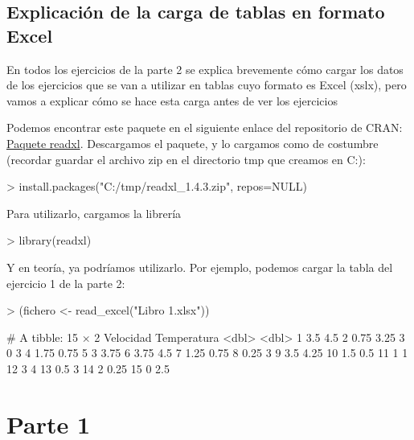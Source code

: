 \documentclass[parskip=full]{scrartcl}
\begin{document}
\subsection{Explicación de la carga de tablas en formato Excel}

En todos los ejercicios de la parte 2 se explica brevemente cómo cargar los datos de los ejercicios que se van a utilizar en tablas cuyo formato es Excel (xslx), pero vamos a explicar cómo se hace esta carga antes de ver los ejercicios

Podemos encontrar este paquete en el siguiente enlace del repositorio de CRAN: \href{https://cran.rediris.es/web/packages/readxl/index.html}{Paquete readxl}. Descargamos el paquete, y lo cargamos como de costumbre (recordar guardar el archivo zip en el directorio tmp que creamos en C:):


\begin{Schunk}
\begin{Sinput}
> install.packages("C:/tmp/readxl_1.4.3.zip", repos=NULL)
\end{Sinput}
\end{Schunk}


Para utilizarlo, cargamos la librería


\begin{Schunk}
\begin{Sinput}
> library(readxl)
\end{Sinput}
\end{Schunk}


Y en teoría, ya podríamos utilizarlo. Por ejemplo, podemos cargar la tabla del ejercicio 1 de la parte 2:


\begin{Schunk}
\begin{Sinput}
> (fichero <- read_excel("Libro 1.xlsx"))
\end{Sinput}
\begin{Soutput}
# A tibble: 15 × 2
   Velocidad Temperatura
       <dbl>       <dbl>
 1      3.5         4.5 
 2      0.75        3.25
 3      0           3   
 4      1.75        0.75
 5      3           3.75
 6      3.75        4.5 
 7      1.25        0.75
 8      0.25        3   
 9      3.5         4.25
10      1.5         0.5 
11      1           1   
12      3           4   
13      0.5         3   
14      2           0.25
15      0           2.5 
\end{Soutput}
\end{Schunk}


\section{Parte 1}
\end{document}

